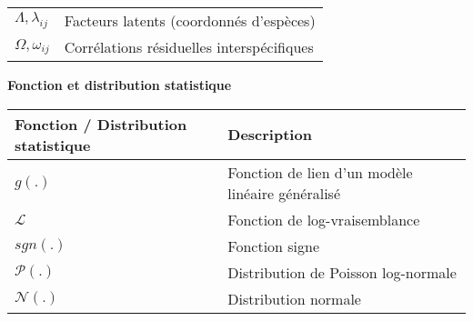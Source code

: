 \begin{longtable}[l]{@{}ll@{}}
\begin{minipage}[t]{0.34\columnwidth}\raggedright
\(\Lambda, \lambda_{ij}\)\strut
\end{minipage} & \begin{minipage}[t]{0.60\columnwidth}\raggedright
Facteurs latents (coordonnés d'espèces)\strut
\end{minipage}\tabularnewline
\begin{minipage}[t]{0.34\columnwidth}\raggedright
\(\Omega, \omega_{ij}\)\strut
\end{minipage} & \begin{minipage}[t]{0.60\columnwidth}\raggedright
Corrélations résiduelles interspécifiques\strut
\end{minipage}\tabularnewline
\bottomrule
\end{longtable}

\textbf{Fonction et distribution statistique}

\begin{longtable}[l]{@{}ll@{}}
\toprule
\begin{minipage}[b]{0.41\columnwidth}\raggedright
Fonction / Distribution statistique\strut
\end{minipage} & \begin{minipage}[b]{0.53\columnwidth}\raggedright
Description\strut
\end{minipage}\tabularnewline
\midrule
\endhead
\begin{minipage}[t]{0.41\columnwidth}\raggedright
\(g(.)\)\strut
\end{minipage} & \begin{minipage}[t]{0.53\columnwidth}\raggedright
Fonction de lien d'un modèle linéaire généralisé\strut
\end{minipage}\tabularnewline
\begin{minipage}[t]{0.41\columnwidth}\raggedright
\(\mathcal L\)\strut
\end{minipage} & \begin{minipage}[t]{0.53\columnwidth}\raggedright
Fonction de log-vraisemblance\strut
\end{minipage}\tabularnewline
\begin{minipage}[t]{0.41\columnwidth}\raggedright
\(sgn(.)\)\strut
\end{minipage} & \begin{minipage}[t]{0.53\columnwidth}\raggedright
Fonction signe\strut
\end{minipage}\tabularnewline
\begin{minipage}[t]{0.41\columnwidth}\raggedright
\(\mathcal P(.)\)\strut
\end{minipage} & \begin{minipage}[t]{0.53\columnwidth}\raggedright
Distribution de Poisson log-normale\strut
\end{minipage}\tabularnewline
\begin{minipage}[t]{0.41\columnwidth}\raggedright
\(\mathcal N(.)\)\strut
\end{minipage} & \begin{minipage}[t]{0.53\columnwidth}\raggedright
Distribution normale\strut
\end{minipage}\tabularnewline
\bottomrule
\end{longtable}

